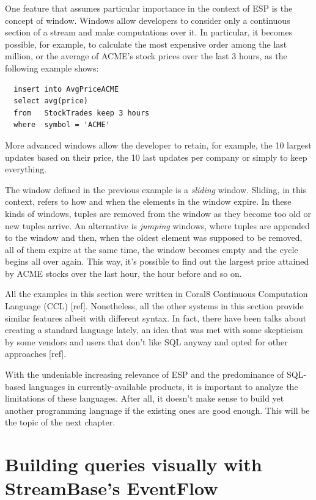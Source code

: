 \documentclass{report}
\begin{document}
One feature that assumes particular importance in the context of ESP
is the concept of window. Windows allow developers to consider only a
continuous section of a stream and make computations over it. In
particular, it becomes possible, for example, to calculate the most
expensive order among the last million, or the average of ACME's stock
prices over the last 3 hours, as the following example shows:

\begin{lstlisting}
  insert into AvgPriceACME
  select avg(price)
  from   StockTrades keep 3 hours
  where  symbol = 'ACME'
\end{lstlisting}

More advanced windows allow the developer to retain, for example, the
10 largest updates based on their price, the 10 last updates per
company or simply to keep everything.

The window defined in the previous example is a \emph{sliding}
window. Sliding, in this context, refers to how and when the elements
in the window expire. In these kinds of windows, tuples are removed
from the window as they become too old or new tuples arrive. An
alternative is \emph{jumping} windows, where tuples are appended to
the window and then, when the oldest element was supposed to be
removed, all of them expire at the same time, the window becomes empty
and the cycle begins all over again. This way, it's possible to find
out the largest price attained by ACME stocks over the last hour, the
hour before and so on.

All the examples in this section were written in Coral8 Continuous
Computation Language (CCL) [ref]. Nonetheless, all the other systems
in this section provide similar features albeit with different
syntax. In fact, there have been talks about creating a standard
language lately, an idea that was met with some skepticism by some
vendors and users that don't like SQL anyway and opted for other
approaches [ref].

With the undeniable increasing relevance of ESP and the predominance
of SQL-based languages in currently-available products, it is
important to analyze the limitations of these languages. After all, it
doesn't make sense to build yet another programming language if the
existing ones are good enough. This will be the topic of the next
chapter.

\section{Building queries visually with StreamBase's EventFlow}
\label{sec:eventflow}
\end{document}
